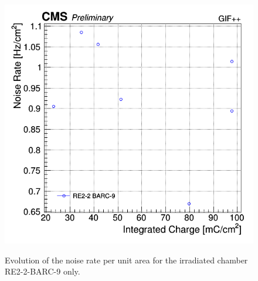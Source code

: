     \begin{figure}[H]
		\centering
    	\includegraphics[width=0.5\linewidth]{fig/chapt5/Noise-vs-Qint-RE2.png}\\
        \caption{\label{Fig:Noise-vs-Qint} Evolution of the noise rate per unit area for the irradiated chamber RE2-2-BARC-9 only.}
    \end{figure}

\clearpage{\pagestyle{empty}\cleardoublepage}